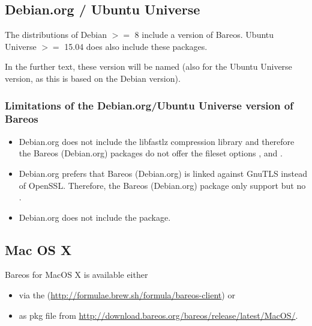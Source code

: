 \subsection{Debian.org / Ubuntu Universe}
\label{sec:DebianOrg}

The distributions of Debian $>=$ 8 include a version of Bareos.
Ubuntu Universe $>=$ 15.04 does also include these packages. 

In the further text, these version will be named  
(also for the Ubuntu Universe version, as this is based on the Debian version).

\subsubsection{Limitations of the Debian.org/Ubuntu Universe version of Bareos}
\label{sec:DebianOrgLimitations}

    \begin{itemize}
        \item Debian.org does not include the libfastlz compression library and therefore the Bareos (Debian.org) packages do not offer the fileset options ,  and .
        \item Debian.org prefers that Bareos (Debian.org) is linked against GnuTLS instead of OpenSSL. Therefore, the Bareos (Debian.org) package only support  but no .
        \item Debian.org does not include the  package.
    \end{itemize}


\subsection{Mac OS X}
\label{sec:macosx}

Bareos for MacOS X is available either

\begin{itemize}
  \item via the  (\url{http://formulae.brew.sh/formula/bareos-client}) or
  \item as pkg file from \url{http://download.bareos.org/bareos/release/latest/MacOS/}.
\end{itemize}


